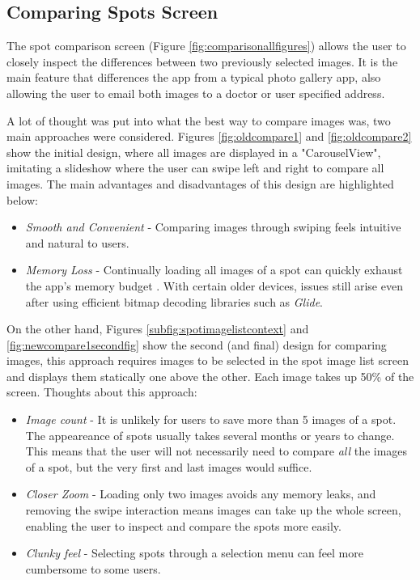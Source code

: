 \subsection{Comparing Spots Screen} \label{CompareScreenDesignSection}

The spot comparison screen (Figure \ref{fig:comparisonallfigures}) allows the user to closely inspect the differences between two previously selected images. It is the main feature that differences the app from a typical photo gallery app, also allowing the user to email both images to a doctor or user specified address.

A lot of thought was put into what the best way to compare images was, two main approaches were considered. Figures \ref{fig:oldcompare1} and \ref{fig:oldcompare2} show the initial design, where all images are displayed in a "CarouselView", imitating a slideshow where the user can swipe left and right to compare all images. The main advantages and disadvantages of this design are highlighted below:
\begin{itemize}
    \item \emph{Smooth and Convenient} - Comparing images through swiping feels intuitive and natural to users.
    \item \emph{Memory Loss} - Continually loading all images of a spot can quickly exhaust the app's memory budget \cite{handlingbitmaps}. With certain older devices, issues still arise even after using efficient bitmap decoding libraries such as \emph{Glide}.
\end{itemize}

On the other hand, Figures \ref{subfig:spotimagelistcontext} and \ref{fig:newcompare1secondfig} show the second (and final) design for comparing images, this approach requires images to be selected in the spot image list screen and displays them statically one above the other. Each image takes up 50\% of the screen. Thoughts about this approach:
\begin{itemize}
    \item \emph{Image count} - It is unlikely for users to save more than 5 images of a spot. The appeareance of spots usually takes several months or years to change. This means that the user will not necessarily need to compare \emph{all} the images of a spot, but the very first and last images would suffice.
    \item \emph{Closer Zoom} - Loading only two images avoids any memory leaks, and removing the swipe interaction means images can take up the whole screen, enabling the user to inspect and compare the spots more easily.
    \item \emph{Clunky feel} - Selecting spots through a selection menu can feel more cumbersome to some users.
\end{itemize}

